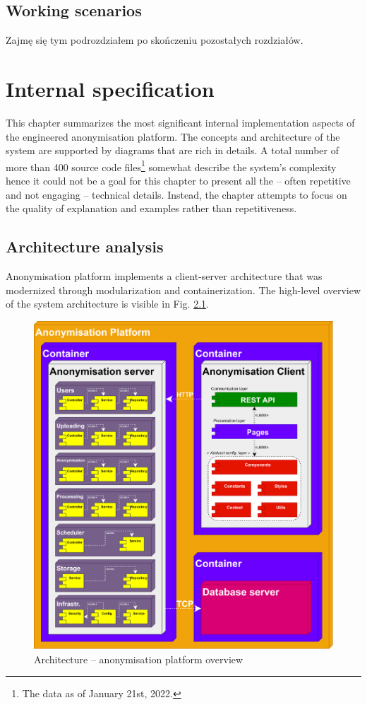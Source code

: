 \documentclass[a4paper,twoside,12pt]{book}
\begin{document}
\section{Working scenarios}

\color{blue}
Zajmę się tym podrozdziałem po skończeniu pozostałych rozdziałów.
\color{black}

\chapter{Internal specification}

This chapter summarizes the most significant internal implementation aspects of the engineered anonymisation platform. The concepts and architecture of the system are supported by diagrams that are rich in details. A total number of more than 400 source code files\footnote{The data as of January 21st, 2022.} somewhat describe the system's complexity hence it could not be a goal for this chapter to present all the -- often repetitive and not engaging -- technical details. Instead, the chapter attempts to focus on the quality of explanation and examples rather than repetitiveness.

\section{Architecture analysis}

Anonymisation platform implements a client-server architecture that was modernized through modularization and containerization. The high-level overview of the system architecture is visible in Fig. \ref{fig:architecture_platform}.

\begin{figure}
  \centering
  \includegraphics[width=\linewidth]{img/architecture_platform.png}
  \caption{Architecture – anonymisation platform overview}
  \label{fig:architecture_platform}
\end{figure}
\end{document}
